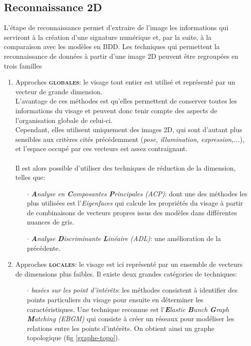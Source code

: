 \subsection{Reconnaissance 2D}
L'étape de reconnaissance permet d'extraire de l'image les informations qui serviront à la création d'une signature numérique et, par la suite, à la comparaison avec les modèles en BDD.
Les techniques qui permettent la reconnaissance de données à partir d'une image 2D peuvent être regroupées en trois familles \cite{Xphdthesis_1}
\begin{enumerate}\setlength{\itemsep}{.3em}
\item Approches \textsc{\textbf{globales}}: le visage tout entier est utilisé et représenté par un vecteur de grande dimension.
\\L'avantage de ces méthodes est qu'elles permettent de conserver toutes les informations du visage et peuvent donc tenir compte des aspects de l'organisation globale de celui-ci. 
\\Cependant, elles utilisent uniquement des images 2D, qui sont d'autant plus sensibles aux critères cités précédemment (\textit{pose, illumination, expression,...}), et l'espace occupé par ces vecteurs est assez contraignant. \paragraph{}Il est alors possible d'utiliser des techniques de réduction de la dimension, telles que:
	\begin{itemize}\setlength{\itemsep}{.3em}
	\item[$\cdot$]\textit{\textbf{A}nalyse en \textbf{C}omposantes \textbf{P}rincipales (ACP)}: dont une des méthodes les plus utilisées est l'\textit{Eigenfaces} qui calcule les propriétés du visage à partir de combinaisons de vecteurs propres issus des modèles dans différentes nuances de gris.
	\item[$\cdot$]\textit{\textbf{A}nalyse \textbf{D}iscriminante \textbf{L}inéaire (ADL)}: une amélioration de la précédente.
	\end{itemize}
\item Approches \textsc{\textbf{locales}}: le visage est ici représenté par un ensemble de vecteurs de dimensions plus faibles. Il existe deux grandes catégories de techniques:
	\begin{itemize}
	\item[$\cdot$] \textit{basées sur les point d'intérêts}: les méthodes consistent à identifier des points particuliers du visage pour ensuite en déterminer les caractéristiques. Une technique reconnue est l'\textit{\textbf{E}lastic \textbf{B}unch \textbf{G}raph \textbf{M}atching (EBGM)} qui consiste à créer un réseaux pour modéliser les relations entre les points d'intérêts. On obtient ainsi un graphe topologique (fig \ref{graphe-topo}).


\end{itemize}
\end{enumerate}
